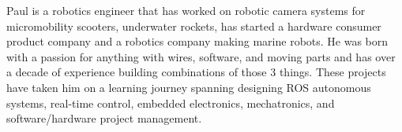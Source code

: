 

\begin{cvparagraph}

Paul is a robotics engineer that has worked on robotic camera systems for micromobility
scooters, underwater rockets, has started a hardware consumer product company
and a robotics company making marine robots. He was born with a passion
for anything with wires, software, and moving parts and has over a decade of
experience building combinations of those 3 things. These projects have taken
him on a learning journey spanning designing ROS autonomous systems, real-time
control, embedded electronics, mechatronics, and software/hardware project
management.
\end{cvparagraph}
